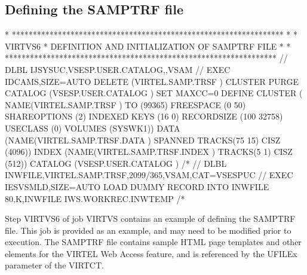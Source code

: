 \documentclass[letterpaper,10pt,english]{sphinxmanual}
\begin{document}
\subsection{Defining the SAMPTRF file}
\label{\detokenize{Installation_Guide:defining-the-samptrf-file}}
\begin{sphinxVerbatim}[commandchars=\\\{\}]
* *****************************************************************
* * VIRTVS6 * DEFINITION AND INITIALIZATION OF SAMPTRF FILE *
* *****************************************************************
// DLBL IJSYSUC,\PYGZsq{}VSESP.USER.CATALOG\PYGZsq{},,VSAM
// EXEC IDCAMS,SIZE=AUTO
  DELETE (VIRTEL.SAMP.TRSF ) \PYGZhy{}
    CLUSTER \PYGZhy{}
    PURGE \PYGZhy{}
    CATALOG (VSESP.USER.CATALOG )
  SET MAXCC=0
  DEFINE CLUSTER ( \PYGZhy{}
    NAME(VIRTEL.SAMP.TRSF ) \PYGZhy{}
    TO (99365) \PYGZhy{}
    FREESPACE (0 50) \PYGZhy{}
    SHAREOPTIONS (2) \PYGZhy{}
    INDEXED \PYGZhy{}
    KEYS (16 0) \PYGZhy{}
    RECORDSIZE (100 32758) \PYGZhy{}
    USECLASS (0) \PYGZhy{}
    VOLUMES (SYSWK1)) \PYGZhy{}
  DATA (NAME(VIRTEL.SAMP.TRSF.DATA ) \PYGZhy{}
    SPANNED \PYGZhy{}
    TRACKS(75 15) \textendash{}
    CISZ (4096)) \PYGZhy{}
  INDEX (NAME(VIRTEL.SAMP.TRSF.INDEX ) \PYGZhy{}
    TRACKS(5 1) \textendash{}
    CISZ (512)) \PYGZhy{}
  CATALOG (VSESP.USER.CATALOG )
/*
// DLBL INWFILE,\PYGZsq{}VIRTEL.SAMP.TRSF\PYGZsq{},2099/365,VSAM,CAT=VSESPUC
// EXEC IESVSMLD,SIZE=AUTO LOAD DUMMY RECORD INTO INWFILE
80,K,INWFILE
\PYGZdl{}\PYGZdl{}\PYGZdl{}\PYGZdl{}IWS.WORKREC.INW\PYGZdl{}TEMP
/*
\end{sphinxVerbatim}

\sphinxAtStartPar
{}

\sphinxAtStartPar
Step VIRTVS6 of job VIRTVS contains an example of defining the SAMPTRF file. This job is provided as an example, and may need to be modified prior to execution. The SAMPTRF file contains sample HTML page templates and other elements for the VIRTEL Web Access feature, and is referenced by the UFILEx parameter of the VIRTCT.
\end{document}
